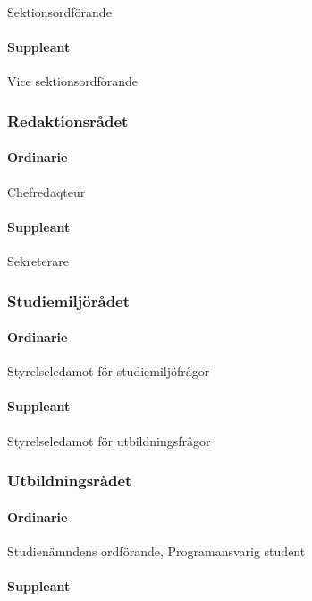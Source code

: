 \documentclass[a4paper,12pt]{article}
\begin{document}
Sektionsordförande

\paragraph{Suppleant}

Vice sektionsordförande

\subsubsection{Redaktionsrådet}

\paragraph{Ordinarie}

Chefredaqteur

\paragraph{Suppleant}

Sekreterare

\subsubsection{Studiemiljörådet}

\paragraph{Ordinarie}

Styrelseledamot för studiemiljöfrågor

\paragraph{Suppleant}

Styrelseledamot för utbildningsfrågor

\subsubsection{Utbildningsrådet}

\paragraph{Ordinarie}

Studienämndens ordförande, Programansvarig student

\paragraph{Suppleant}
\end{document}
